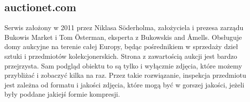 
\subsection{auctionet.com}
Serwis założony w 2011 przez Niklasa Söderholma, założyciela i prezesa zarządu Bukowis Market i Tom Österman, eksperta z Bukowskis and Åmells. Obsługuje domy aukcyjne na terenie całej Europy, będąc pośrednikiem w sprzedaży dzieł sztuki i przedmiotów kolekcjonerskich. Strona z zawartością aukcji jest bardzo przejrzysta. Sam podgląd obiektu to są tylko i wyłącznie zdjęcia, które możemy przybliżać i zobaczyć kilka na raz. Przez takie rozwiązanie, inspekcja przedmiotu jest zależna od formatu i jakości zdjęcia, które mogą być w gorszej jakości, jeżeli były poddane jakiejś formie kompresji.


